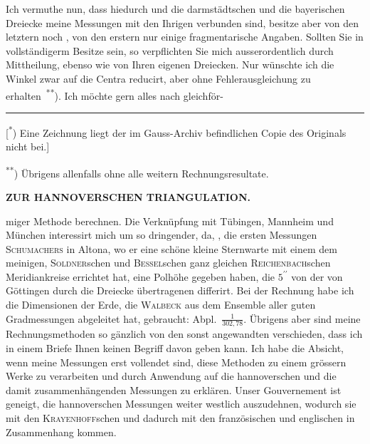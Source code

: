 \par\noindent\hspace*{\parindent}Ich vermuthe nun, dass hiedurch und die darmstädtschen und die bayerischen Dreiecke meine Messungen mit den Ihrigen verbunden sind, besitze aber von den letztern noch , von den erstern nur einige fragmentarische Angaben.
Sollten Sie in vollständigerm Besitze sein, so verpflichten Sie mich ausserordentlich durch Mittheilung, ebenso wie von Ihren eigenen Dreiecken.
Nur wünschte ich die Winkel zwar auf die Centra reducirt, aber ohne Fehlerausgleichung zu erhalten~\textsuperscript{**}).
Ich möchte gern alles nach gleichför-
\par\smallskip\noindent\rule{.24\textwidth}{.4pt}\par\smallskip
{\footnotesize
\noindent\hspace*{1.5em}[\textsuperscript{*}) Eine Zeichnung liegt der im Gauss-Archiv befindlichen Copie des Originals nicht bei.]\par
\noindent\hspace*{1.5em}\textsuperscript{**}) Übrigens allenfalls ohne alle weitern Rechnungsresultate.\par
}
\clearpage
\noindent\null\hfill{\small\textbf{ZUR HANNOVERSCHEN TRIANGULATION.}}\hfill{}\par\medskip
\noindent miger Methode berechnen.
Die Verknüpfung mit Tübingen, Mannheim und München interessirt mich um so dringender, da, , die ersten Messungen \textsc{Schumachers} in Altona, wo er eine schöne kleine Sternwarte mit einem dem meinigen, \textsc{Soldner}schen und \textsc{Bessel}schen ganz gleichen \textsc{Reichenbach}schen Meridiankreise errichtet hat, eine Polhöhe gegeben haben, die \(5^{\prime\prime}\) von der von Göttingen durch die Dreiecke übertragenen differirt.
Bei der Rechnung habe ich die Dimensionen der Erde, die \textsc{Walbeck} aus dem Ensemble aller guten Gradmessungen abgeleitet hat, gebraucht: Abpl.\ \(\frac{1}{302{,}78}\).
Übrigens aber sind meine Rechnungsmethoden so gänzlich von den sonst angewandten verschieden, dass ich in einem Briefe Ihnen keinen Begriff davon geben kann.
Ich habe die Absicht, wenn meine Messungen erst vollendet sind, diese Methoden zu einem grössern Werke zu verarbeiten und durch Anwendung auf die hannoverschen und die damit zusammenhängenden Messungen zu erklären.
Unser Gouvernement ist geneigt, die hannoverschen Messungen weiter westlich auszudehnen, wodurch sie mit den \textsc{Krayenhoff}schen und dadurch mit den französischen und englischen in Zusammenhang kommen.
